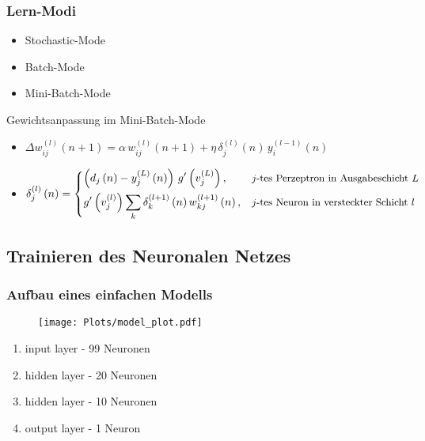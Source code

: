 \begin{frame}
  \frametitle{Lern-Modi}
  \begin{itemize}
    \item Stochastic-Mode
    \item Batch-Mode
    \item Mini-Batch-Mode
  \end{itemize}
  \begin{block}{Gewichtsanpassung im Mini-Batch-Mode}
    \begin{itemize}
      \item $\Delta w_{ij}^{\left( l \right)}\left(n + 1\right) = \alpha \, w_{ij}^{\left( l \right)}\left(n + 1\right)
         + \eta \, \delta_j^{\left( l \right)}\left(n \right) \, y_i^{\left( l-1 \right)}\left(n \right)$
      \item $\delta_{j}^{\left( l \right)}\left(n \right) =
            \begin{dcases*}
              \left( d_j \left( n \right) - y_j^{\left( L \right)} \left(n \right) \right) \, g'\left( v_j^{\left(L \right)}\right)
              ,& \small{$j$-tes Perzeptron in Ausgabeschicht $L$}\\
              g'\left( v_j^{\left(l \right)}\right) \sum_{k} \delta_k^{\left(l+1\right)}\left(n\right) w_{kj}^{\left(l+1\right)}\left(n\right)
              ,& \small{$j$-tes Neuron in versteckter Schicht $l$}
            \end{dcases*}$
    \end{itemize}
  \end{block}

\end{frame}


\subsection{Trainieren des Neuronalen Netzes}

\begin{frame}
  \frametitle{Aufbau eines einfachen Modells}
  \begin{minipage}{0.5\textwidth}
    \begin{figure}
      \centering
      \texttt{[image: Plots/model\_plot.pdf]}
    \end{figure}
  \end{minipage}%
  \hfill%
  \begin{minipage}{0.5\textwidth}
    \begin{enumerate}
      \item input layer - 99 Neuronen
      \item hidden layer - 20 Neuronen
      \item hidden layer - 10 Neuronen
      \item output layer - 1 Neuron
    \end{enumerate}
  \end{minipage}
\end{frame}

